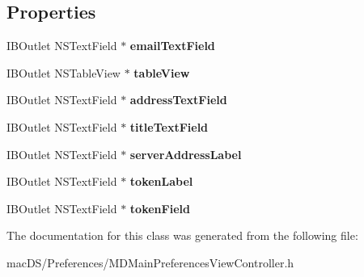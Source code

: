\subsection*{Properties}
\begin{DoxyCompactItemize}
\item 
\hypertarget{interface_m_d_main_preferences_view_controller_aff6ff5721b6a596b9ab8a5d965c99c68}{I\-B\-Outlet N\-S\-Text\-Field $\ast$ {\bfseries email\-Text\-Field}}\label{interface_m_d_main_preferences_view_controller_aff6ff5721b6a596b9ab8a5d965c99c68}

\item 
\hypertarget{interface_m_d_main_preferences_view_controller_aa61a9ae962dc2a8d7fd5be8f36c8cf62}{I\-B\-Outlet N\-S\-Table\-View $\ast$ {\bfseries table\-View}}\label{interface_m_d_main_preferences_view_controller_aa61a9ae962dc2a8d7fd5be8f36c8cf62}

\item 
\hypertarget{interface_m_d_main_preferences_view_controller_a9dfae1433203c8ec852648b2da348020}{I\-B\-Outlet N\-S\-Text\-Field $\ast$ {\bfseries address\-Text\-Field}}\label{interface_m_d_main_preferences_view_controller_a9dfae1433203c8ec852648b2da348020}

\item 
\hypertarget{interface_m_d_main_preferences_view_controller_a6f4d01ff12f22736a888a23bd51ad22f}{I\-B\-Outlet N\-S\-Text\-Field $\ast$ {\bfseries title\-Text\-Field}}\label{interface_m_d_main_preferences_view_controller_a6f4d01ff12f22736a888a23bd51ad22f}

\item 
\hypertarget{interface_m_d_main_preferences_view_controller_a44cd3a513344639ec3e1e7e6bc8aed99}{I\-B\-Outlet N\-S\-Text\-Field $\ast$ {\bfseries server\-Address\-Label}}\label{interface_m_d_main_preferences_view_controller_a44cd3a513344639ec3e1e7e6bc8aed99}

\item 
\hypertarget{interface_m_d_main_preferences_view_controller_a598365193d39fd6737dfb0e73a5a01c5}{I\-B\-Outlet N\-S\-Text\-Field $\ast$ {\bfseries token\-Label}}\label{interface_m_d_main_preferences_view_controller_a598365193d39fd6737dfb0e73a5a01c5}

\item 
\hypertarget{interface_m_d_main_preferences_view_controller_a7a49586da4593f1a245e506a493bf1c5}{I\-B\-Outlet N\-S\-Text\-Field $\ast$ {\bfseries token\-Field}}\label{interface_m_d_main_preferences_view_controller_a7a49586da4593f1a245e506a493bf1c5}

\end{DoxyCompactItemize}


The documentation for this class was generated from the following file\-:\begin{DoxyCompactItemize}
\item 
mac\-D\-S/\-Preferences/M\-D\-Main\-Preferences\-View\-Controller.\-h\end{DoxyCompactItemize}
